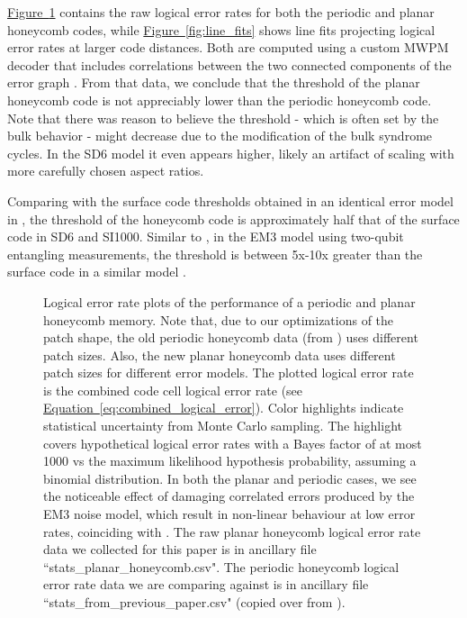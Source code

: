 \documentclass[onecolumn,unpublished,a4paper]{quantumarticle}
\theoremstyle{definition}
\theoremstyle{definition}
\theoremstyle{definition}
\newcommand{\eq}[1]{\hyperref[eq:#1]{Equation~\ref*{eq:#1}}}
\newcommand{\fig}[1]{\hyperref[fig:#1]{Figure~\ref*{fig:#1}}}
\begin{document}
\fig{thresholds} contains the raw logical error rates for both the periodic and planar honeycomb codes, while \fig{line_fits} shows line fits projecting logical error rates at larger code distances.
Both are computed using a custom MWPM decoder that includes correlations between the two connected components of the error graph \cite{gidney2021honeycombmemory, fowler2013optimal}. 
From that data, we conclude that the threshold of the planar honeycomb code is not appreciably lower than the periodic honeycomb code.  
Note that there was reason to believe the threshold - which is often set by the bulk behavior - might decrease due to the modification of the bulk syndrome cycles.
In the SD6 model it even appears higher, likely an artifact of scaling with more carefully chosen aspect ratios.

Comparing with the surface code thresholds obtained in an identical error model in \cite{gidney2021honeycombmemory}, the threshold of the honeycomb code is approximately half that of the surface code in SD6 and SI1000.
Similar to \cite{gidney2021honeycombmemory}, in the EM3 model using two-qubit entangling measurements, the threshold is between 5x-10x greater than the surface code in a similar model \cite{chao2020optimization}.

\begin{figure}[ht!]
    \centering
    \caption{
    Logical error rate plots of the performance of a periodic and planar honeycomb memory.
    Note that, due to our optimizations of the patch shape, the old periodic honeycomb data (from \cite{gidney2021honeycombmemory}) uses different patch sizes.
    Also, the new planar honeycomb data uses different patch sizes for different error models.
    The plotted logical error rate is the combined code cell logical error rate (see \eq{combined_logical_error}).
    Color highlights indicate statistical uncertainty from Monte Carlo sampling.
    The highlight covers hypothetical logical error rates with a Bayes factor of at most 1000 vs the maximum likelihood hypothesis probability, assuming a binomial distribution.
    In both the planar and periodic cases, we see the noticeable effect of damaging correlated errors produced by the EM3 noise model, which result in non-linear behaviour at low error rates, coinciding with \cite{gidney2021honeycombmemory}.
    The raw planar honeycomb logical error rate data we collected for this paper is in ancillary file ``stats\_planar\_honeycomb.csv".
    The periodic honeycomb logical error rate data we are comparing against is in ancillary file ``stats\_from\_previous\_paper.csv" (copied over from \cite{gidney2021honeycombmemory}).
    }
    \label{fig:thresholds}
\end{figure}
\end{document}
